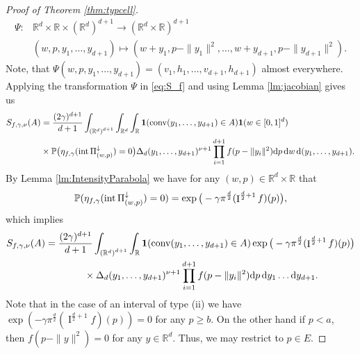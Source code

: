 \documentclass[11pt,a4paper]{article}
\theoremstyle{plain}
\theoremstyle{definition}
\theoremstyle{remark}
\def\PP{\mathbb{P}}
\def\RR{\mathbb{R}}
\newcommand{\dd}{{\rm d}}
\newcommand{\conv}{\mathop{\mathrm{conv}}\nolimits}
\newcommand{\frI}{\mathop{\mathrm{I}}\nolimits}
\newcommand{\inter}{\operatorname{int}}
\begin{document}
\begin{proof}[Proof of Theorem \ref{thm:typcell}]
    \begin{align*}
        \Psi\colon  &\RR^{d} \times \RR \times (\RR^{d})^{d+1} \to (\RR^{d} \times \RR)^{d+1}\\
        &(w,p,y_1,\dots,y_{d+1}) \mapsto (w+y_1,p-\|y_1\|^2,\dots,w+y_{d+1},p-\|y_{d+1}\|^2).
    \end{align*} 
    Note, that $\Psi(w,p,y_1,\dots,y_{d+1})=(v_1,h_1,\ldots,v_{d+1},h_{d+1})$ almost everywhere. Applying the transformation $\Psi$ in \eqref{eq:S_f} and using Lemma \ref{lm:jacobian} gives us 
    \begin{align*}
        S_{f,\gamma,\nu}(A)&=\frac{(2\gamma)^{d+1}}{d+1}\int_{{(\RR^{d})}^{d+1}} \int_{\RR^{d}} \int_{\RR} {\bf 1}(\conv(y_1,\dots,y_{d+1})\in A){\bf 1}(w\in [0,1]^{d})\\
        &\times \PP\big(\eta_{f,\gamma}(\inter\Pi_{(w,p)}^{\downarrow})=0\big)\Delta_{d}(y_1,\dots,y_{d+1})^{\nu+1}\prod_{i=1}^{d+1}f(p-\|y_i\|^2)\dd p\, \dd w\, \dd(y_1,\dots,y_{d+1}).
    \end{align*}
    By Lemma \ref{lm:IntensityParabola} we have for any $(w,p)\in\RR^d\times \RR$ that
    \[
        \PP(\eta_{f,\gamma}(\inter\Pi^\downarrow_{(w,p)})=0)=\exp\big(-\gamma\pi^{d\over 2}(\frI^{{d\over 2}+1}f)(p)\big),
    \]
    which implies
    \begin{align*}
        S_{f,\gamma,\nu}(A)&=\frac{(2\gamma)^{d+1}}{d+1}\int_{{(\RR^{d})}^{d+1}} \int_{\RR} {\bf 1}(\conv(y_1,\dots,y_{d+1})\in A)\exp\big(-\gamma\pi^{\frac{d}{2}}(\frI^{\frac{d}{2}+1}f)(p)\big)\\
        &\qquad\qquad\times\Delta_{d}(y_1,\dots,y_{d+1})^{\nu+1}\prod_{i=1}^{d+1}f(p-\|y_i\|^2)\dd p\, \dd y_1\dots \dd y_{d+1}.
    \end{align*}
     Note that in the case of an interval of type (ii) we have $\exp(-\gamma\pi^{\frac{d}{2}}(\frI^{\frac{d}{2}+1}f)(p))=0$ for any $p\ge b$. On the other hand if $p<a$, then $f(p-\|y\|^2)=0$ for any $y\in\RR^d$. Thus, we may restrict to $p\in E$.
     

\end{proof}
\end{document}
